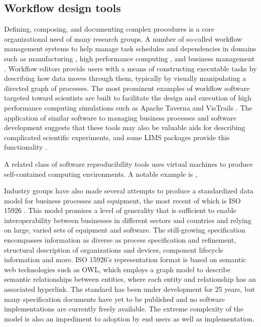 \documentclass[../thesis]{subfiles}
\begin{document}
\subsection{Workflow design tools}

Defining, composing, and documenting complex procedures is a core
organizational need of many research groups. A number of so-called
workflow management systems to help manage task schedules and
dependencies in domains such as manufacturing \cite{}, high performance computing
\cite{VisTrails}, and business management
\cite{cardoso2004workflow}. Workflow editors provide users with a
means of constructing executable tasks by describing how
data moves through them, typically by visually manipulating a directed
graph of processes. The most prominent examples of workflow software
targeted toward scientists are built to facilitate the design and
execution of high performance computing simulations such as Apache
Taverna \cite{Taverna} and VisTrails \cite{VisTrails}. The application
of similar software to managing business processes and software
development suggests that these tools may also be valuable aids for
describing complicated scientific experiments, and some \gls{LIMS} packages
provide this functionality \cite{CoreLIMS}.

A related class of software reproducibility tools uses virtual
machines to produce self-contained computing environments. A notable
example is \cite{ReproZip},

Industry groups have also made several attempts to produce a
standardized data model for business processes and equipment, the
most recent of which is ISO 15926 \cite{West2009}. This model promises
a level of generality that is sufficient to enable interoperability
between businesses in different sectors and countries and relying on
large, varied sets of equipment and software. The still-growing
specification encompasses information as diverse as process
specification and refinement, structural description of organizations
and devices, component lifecycle information and more. ISO 15926's
representation format is based on semantic web technologies such as OWL, which
employs a graph model to describe semantic relationships between
entities, where each entity and relationship has an associated
hyperlink. The standard has been under development for 25 years, but
many specification documents have yet to be published and no software
implementations are currently freely available. The extreme complexity
of the model is also an impediment to adoption by end users as well as
implementation.
\end{document}
